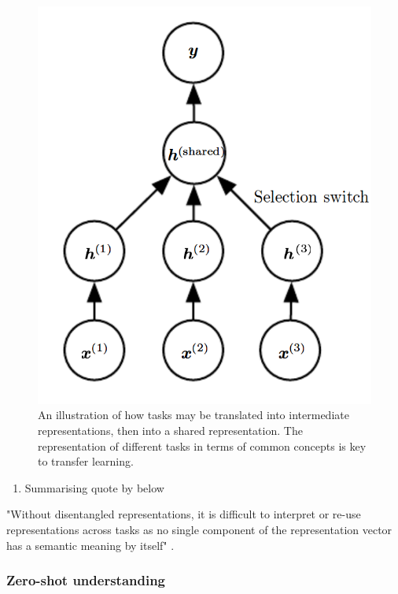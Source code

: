 \documentclass[12pt,twoside]{article}
\begin{document}
\begin{figure}
\includegraphics[scale=0.3]{figures/goodfellow_2015_15_2.png}
\centering
\captionsetup{justification=centering}
\caption{An illustration of how tasks may be translated into intermediate representations, then into a shared representation. The representation of different tasks in terms of common concepts is key to transfer learning. \cite{IanGoodfellowYoshuaBengio2015}}
\label{transfer_learning_graph_intuition}
\end{figure}

\begin{enumerate}
\item Summarising quote by \cite{Whitney2016} below
\end{enumerate}

"Without disentangled representations, it is difficult to interpret or re-use representations across tasks as no single component of the representation vector has a semantic meaning by itself" \cite{Whitney2016}.

\subsubsection{Zero-shot understanding}
\end{document}

